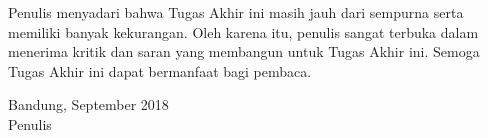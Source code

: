 Penulis menyadari bahwa Tugas Akhir ini masih jauh dari sempurna serta memiliki banyak kekurangan. Oleh karena itu, penulis sangat terbuka dalam menerima kritik dan saran yang membangun untuk Tugas Akhir ini. Semoga Tugas Akhir ini dapat bermanfaat bagi pembaca.

\begin{flushright}
Bandung, September 2018 \\
\vspace{25mm}
Penulis
\end{flushright}

